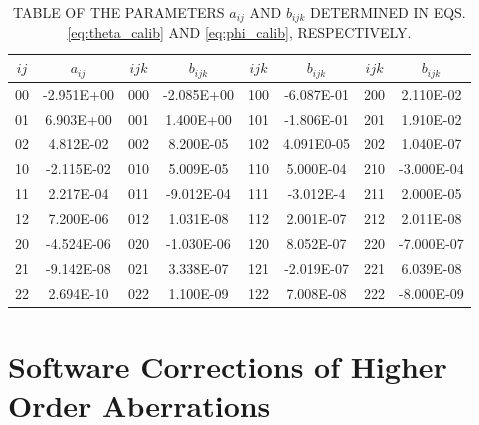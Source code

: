 \begin{table}[tpb]
    \setlength{\capwidth}{0.7\textwidth}
    \begin{center}
       \caption{TABLE OF THE PARAMETERS $a_{ij}$ AND $b_{ijk}$ DETERMINED IN EQS.\ref{eq:theta_calib} AND \ref{eq:phi_calib}, RESPECTIVELY.}
       \label{tb:sieve-slit}
       \begin{tabular}{cc||cc|cc|cc}
	\hline
    \hline

    $ij$ & $a_{ij}$     & $ijk$ & $b_{ijk}$ & $ijk$ & $b_{ijk}$  & $ijk$  & $b_{ijk}$  \\
    \hline
     00  &  -2.951E+00  & 000    & -2.085E+00    &  100  &  -6.087E-01     &  200   &    2.110E-02                    \\
     01  &  6.903E+00   & 001    &  1.400E+00    &  101  &  -1.806E-01     &  201   &    1.910E-02                      \\
     02  &  4.812E-02   & 002    &  8.200E-05    &  102  &  4.091E0-05     &  202   &    1.040E-07          \\
     10  &  -2.115E-02  & 010    &  5.009E-05    &  110  &   5.000E-04     &  210   &    -3.000E-04                   \\
     11  &   2.217E-04  & 011    &  -9.012E-04   &  111  &   -3.012E-4     &  211   &    2.000E-05                   \\
     12  &   7.200E-06  & 012    &  1.031E-08    &  112  &   2.001E-07     &  212   &    2.011E-08                 \\
     20  &  -4.524E-06  & 020    &  -1.030E-06   &  120  &   8.052E-07     &  220   &    -7.000E-07                 \\
     21  &  -9.142E-08  & 021    &  3.338E-07    &  121  &   -2.019E-07    &  221   &    6.039E-08             \\
     22  &  2.694E-10   & 022    &  1.100E-09    &  122  &   7.008E-08     &  222   &    -8.000E-09                \\

       \hline
       \hline
       \end{tabular}
     \end{center}
\end{table}



\section{Software Corrections  of Higher Order Aberrations}

